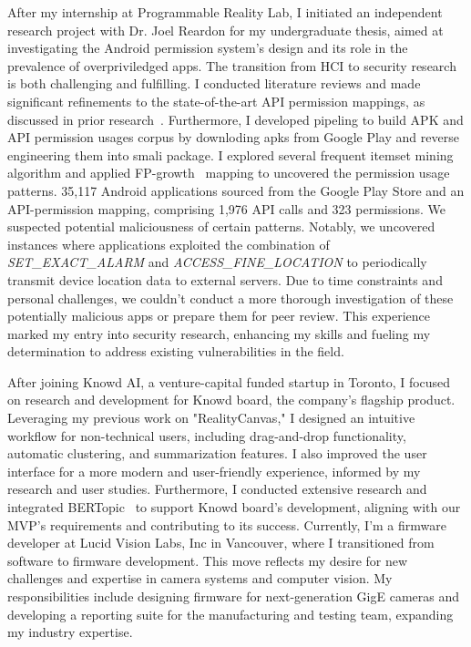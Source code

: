 \documentclass{article}
\begin{document}
After my internship at Programmable Reality Lab, I initiated an independent research project with Dr. Joel Reardon for my undergraduate thesis,  
aimed at investigating the Android permission system's design and its role in the 
prevalence of overpriviledged apps. The transition from HCI to security research is both 
challenging and fulfilling. I conducted literature reviews and 
made significant refinements to the 
state-of-the-art API permission mappings, as discussed in prior research~\cite{felt2011android,au2012pscout}. 
Furthermore, I developed pipeling to build APK and API permission usages corpus by downloding apks from Google Play and 
reverse engineering them into smali package. I explored several frequent itemset mining algorithm 
and applied FP-growth~\cite{borgelt2005implementation} mapping to uncovered the permission usage patterns. 
35,117 Android applications sourced from the Google Play Store and an API-permission mapping, 
comprising 1,976 API calls and 323 permissions. We suspected potential maliciousness of certain 
patterns. Notably, we uncovered instances where applications exploited the 
combination of \textit{SET\_EXACT\_ALARM} and \textit{ACCESS\_FINE\_LOCATION} to periodically transmit device location 
data to external servers. Due to time constraints and personal challenges, we couldn't conduct a more thorough 
investigation of these potentially malicious apps or prepare them for peer review. 
This experience marked my entry into security research, 
enhancing my skills and fueling my determination to address existing vulnerabilities in the field.

After joining Knowd AI, a venture-capital funded startup in Toronto, 
I focused on research and development for Knowd board, the company's flagship product.
Leveraging my previous work on "RealityCanvas," I designed an intuitive workflow for non-technical users, 
including drag-and-drop functionality, automatic clustering, and summarization features. 
I also improved the user interface for a more modern and user-friendly experience, 
informed by my research and user studies.
Furthermore, I conducted extensive research and integrated 
BERTopic~\cite{BERT} to support Knowd board's development, aligning 
with our MVP's requirements and contributing to its success. 
Currently, I'm a firmware developer at Lucid Vision Labs, Inc in Vancouver, 
where I transitioned from software to firmware development. This move reflects 
my desire for new challenges and expertise in camera systems and computer vision. 
My responsibilities include designing firmware for next-generation GigE cameras and 
developing a reporting suite for the manufacturing and testing team, expanding my industry expertise.
\end{document}
